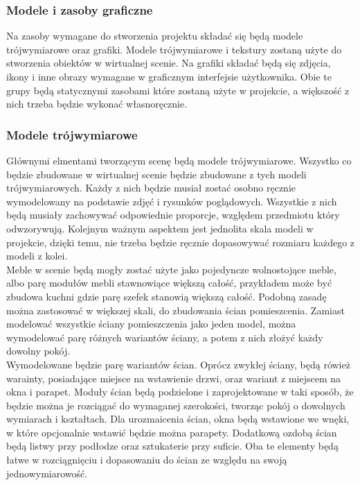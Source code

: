 \documentclass{article} %
\begin{document}
        \subsubsection{Modele i zasoby graficzne}
            Na zasoby wymagane do stworzenia projektu składać się będą modele trójwymiarowe oraz grafiki. Modele trójwymiarowe i tekstury zostaną użyte do stworzenia obiektów w wirtualnej scenie. Na grafiki składać będą się zdjęcia, ikony i inne obrazy wymagane w graficznym interfejsie użytkownika. Obie te grupy będą statycznymi zasobami które zostaną użyte w projekcie, a większość z nich trzeba będzie wykonać własnoręcznie.
            \\
        
        \subsubsection{Modele trójwymiarowe}
            Głównymi elmentami tworzącym scenę będą modele trójwymiarowe. Wszystko co będzie zbudowane w wirtualnej scenie będzie zbudowane z tych modeli trójwymiarowych. Każdy z nich będzie musiał zostać osobno ręcznie wymodelowany na podstawie zdjęć i rysunków poglądowych. Wszystkie z nich będą musiały zachowywać odpowiednie proporcje, względem przedmiotu który odwzorywują. Kolejnym ważnym aspektem jest jednolita skala modeli w projekcie, dzięki temu, nie trzeba będzie ręcznie dopasowywać rozmiaru każdego z modeli z kolei.
            \\
            
            Meble w scenie będą mogły zostać użyte jako pojedyncze wolnostojące meble, albo parę modułów mebli stawnowiące większą całość, przykładem może być zbudowa kuchni gdzie parę szefek stanowią większą całość. Podobną zasadę można zastosować w większej skali, do zbudowania ścian pomieszcenia. Zamiast modelować wszystkie ściany pomieszczenia jako jeden model, można wymodelować parę różnych wariantów ściany, a potem z nich złożyć każdy dowolny pokój.
            \\
            
            Wymodelowane będzie parę wariantów ścian. Oprócz zwykłej ściany, będą rówież warainty, posiadające miejsce na wstawienie drzwi, oraz wariant z miejscem na okna i parapet. Moduły ścian będą podzielone i zaprojektowane w taki sposób, że będzie można je rozciągać do wymaganej szerokości, tworząc pokój o dowolnych wymiarach i kształtach. Dla urozmaicenia ścian, okna będą wstawione we wnęki, w które opcjonalnie wstawić będzie można parapety. Dodatkową ozdobą ścian będą listwy przy podłodze oraz sztukaterie przy suficie. Oba te elementy będą łatwe w rozciągnięciu i dopasowaniu do ścian ze względu na swoją jednowymiarowość.
            \\
            
\end{document}
